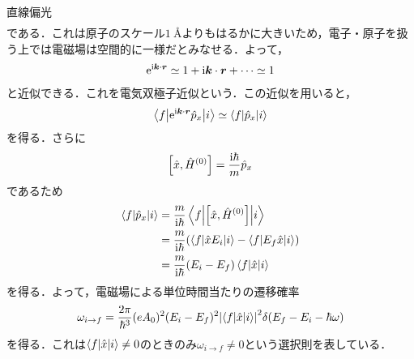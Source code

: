 \documentclass{report}
\begin{document}
\begin{myex}{直線偏光}{}
\begin{align}
    \end{align}
    である．これは原子のスケール$1\ \si{\angstrom}$よりもはるかに大きいため，電子・原子を扱う上では電磁場は空間的に一様だとみなせる．よって，
    \begin{align}
      \mathrm{e}^{\mathrm{i}\bm{k}\cdot\bm{r}}\simeq 1 + \mathrm{i} \bm{k} \cdot \bm{r} + \cdots \simeq 1
    \end{align}
    と近似できる．これを電気双極子近似という．この近似を用いると，
    \begin{align}
      \mel**{f}{\mathrm{e}^{\mathrm{i} \bm{k} \cdot \bm{r}}\hat{p}_x}{{i}} \simeq \mel**{f}{\hat{p}_x}{i}
    \end{align}
    を得る．さらに
    \begin{align}
      \qty[\hat{x}, \hat{H}^{(0)}] = \frac{\mathrm{i} \hbar}{m}\hat{p}_x
    \end{align}
    であるため
    \begin{align}
      \mel**{f}{\hat{p}_x}{i} &= \frac{m}{\mathrm{i}\hbar} \mel**{f}{\qty[\hat{x}, \hat{H}^{(0)}]}{i} \\ 
      &= \frac{m}{\mathrm{i}\hbar} \qty(\mel**{f}{\hat{x}E_i}{i} - \mel**{f}{E_f\hat{x}}{i}) \\ 
      &= \frac{m}{\mathrm{i}\hbar} (E_i - E_f)\mel**{f}{\hat{x}}{i}
    \end{align}
    を得る．よって，電磁場による単位時間当たりの遷移確率
    \begin{align}
      \omega_{i \to f} = \frac{2\pi}{\hbar^3} (eA_0)^2 (E_i - E_f)^2 \abs{\mel**{f}{\hat{x}}{i}}^2 \delta(E_f - E_i - \hbar\omega) 
    \end{align}
    を得る．これは$\mel**{f}{\hat{x}}{i} \neq 0$のときのみ$\omega_{i\to f} \neq 0$という選択則を表している．
  \end{myex}
\end{document}

